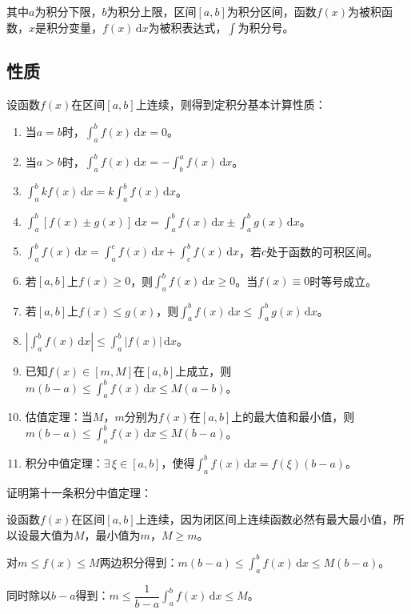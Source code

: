 \documentclass[UTF8, 12pt]{ctexart}
\begin{document}
其中$a$为积分下限，$b$为积分上限，区间$[a,b]$为积分区间，函数$f(x)$为被积函数，$x$是积分变量，$f(x)\,\textrm{d}x$为被积表达式，$\int$为积分号。

\subsection{性质}

设函数$f(x)$在区间$[a,b]$上连续，则得到定积分基本计算性质：

\begin{enumerate}
    \item 当$a=b$时，$\int_a^bf(x)\,\textrm{d}x=0$。
    \item 当$a>b$时，$\int_a^bf(x)\,\textrm{d}x=-\int_b^af(x)\,\textrm{d}x$。
    \item $\int_a^bkf(x)\,\textrm{d}x=k\int_a^bf(x)\,\textrm{d}x$。
    \item $\int_a^b[f(x)\pm g(x)]\,\textrm{d}x=\int_a^bf(x)\,\textrm{d}x\pm\int_a^bg(x)\,\textrm{d}x$。
    \item $\int_a^bf(x)\,\textrm{d}x=\int_a^cf(x)\,\textrm{d}x+\int_c^bf(x)\,\textrm{d}x$，若$c$处于函数的可积区间。
    \item 若$[a,b]$上$f(x)\geqslant 0$，则$\int_a^bf(x)\,\textrm{d}x\geqslant 0$。当$f(x)\equiv0$时等号成立。
    \item 若$[a,b]$上$f(x)\leqslant g(x)$，则$\int_a^bf(x)\,\textrm{d}x\leqslant\int_a^bg(x)\,\textrm{d}x$。
    \item $\left\vert\int_a^bf(x)\,\textrm{d}x\right\vert\leqslant\int_a^b\vert f(x)\vert\,\textrm{d}x$。
    \item 已知$f(x)\in[m,M]$在$[a,b]$上成立，则$m(b-a)\leqslant\int_a^bf(x)\,\textrm{d}x\leqslant M(a-b)$。
    \item 估值定理：当$M$，$m$分别为$f(x)$在$[a,b]$上的最大值和最小值，则$m(b-a)\leqslant\int_a^bf(x)\,\textrm{d}x\leqslant M(b-a)$。
    \item 积分中值定理：$\exists\,\xi\in[a,b]$，使得$\int_a^bf(x)\,\textrm{d}x=f(\xi)(b-a)$。
\end{enumerate}

证明第十一条积分中值定理：

设函数$f(x)$在区间$[a,b]$上连续，因为闭区间上连续函数必然有最大最小值，所以设最大值为$M$，最小值为$m$，$M\geqslant m$。

对$m\leqslant f(x)\leqslant M$两边积分得到：$m(b-a)\leqslant\int_a^bf(x)\,\textrm{d}x\leqslant M(b-a)$。

同时除以$b-a$得到：$m\leqslant\dfrac{1}{b-a}\int_a^bf(x)\,\textrm{d}x\leqslant M$。
\end{document}
